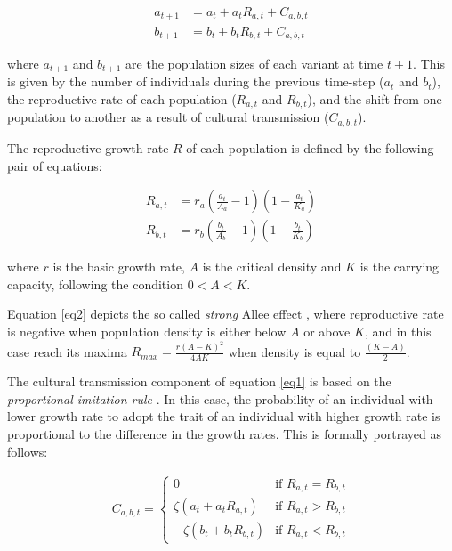 \documentclass[review,authoryear]{elsarticle}
\begin{document}
\begin{equation}
\begin{aligned}
a_{t+1}& = a_t + a_t R_{a,t} + C_{a,b,t} \\
b_{t+1}& = b_t + b_t R_{b,t} + C_{a,b,t}
\label{eq1}
\end{aligned}
\end{equation}

where $a_{t+1}$ and $b_{t+1}$ are the population sizes of each variant at time $t+1$. This is given by the number of individuals during the previous time-step ($a_t$ and $b_t$), the reproductive rate of each population ($R_{a,t}$ and $R_{b,t}$), and the shift from one population to another as a result of cultural transmission ($C_{a,b,t}$).

The reproductive growth rate $R$ of each population is defined by the following pair of equations:

\begin{equation}
\begin{aligned}
R_{a,t}& = r_a \left(\frac{a_t}{A_a}-1\right)\left(1-\frac{a_t}{K_a}\right)\\
R_{b,t}& = r_b \left(\frac{b_t}{A_b}-1\right)\left(1-\frac{b_t}{K_b}\right) 
\label{eq2}
\end{aligned}
\end{equation}

where $r$ is the basic growth rate, $A$ is the critical density and $K$ is the carrying capacity, following the condition $0<A < K$. 

Equation \eqref{eq2} depicts the so called \emph{strong} Allee effect \citep{Wang_and_Kot_2001}, where reproductive rate is negative when population density is either below $A$ or above $K$, and in this case reach its maxima $R_{max}=\frac{r(A-K)^2}{4AK}$ when density is equal to $\frac{(K-A)}{2}$. 

The cultural transmission component of equation \eqref{eq1} is based on the \emph{proportional imitation rule} \citep{schlag1998}. In this case, the probability of an individual with lower growth rate to adopt the trait of an individual with higher growth rate is proportional to the difference in the growth rates. This is formally portrayed as follows:

\begin{equation}
\begin{aligned}
\label{eq3}
C_{a,b,t} = 
\begin{cases}
0& \text{if } R_{a,t} = R_{b,t}\\
\zeta(a_t+a_tR_{a,t})& \text{if } R_{a,t} > R_{b,t}\\
-\zeta(b_t+b_tR_{b,t})& \text{if } R_{a,t} < R_{b,t}
\end{cases}
\end{aligned}
\end{equation}
\end{document}

